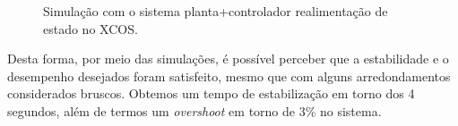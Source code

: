 \begin{figure}[H]
\begin{center}
\end{center}
\caption{Simulação com o sistema planta+controlador realimentação de estado no XCOS.}
\label{xcos:state} 
\end{figure}

Desta forma, por meio das simulações, é possível perceber que a estabilidade e o desempenho desejados foram satisfeito, mesmo que com alguns arredondamentos considerados bruscos. Obtemos um tempo de estabilização em torno dos 4 segundos, além de termos um \textit{overshoot} em torno de 3\% no sistema.

